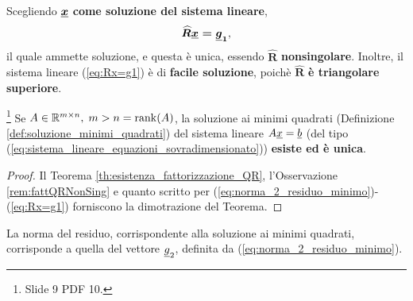 \addtocounter{footnote}{-6}







Scegliendo $\boldsymbol{\uline x}$ \textbf{come soluzione del sistema lineare},
\begin{equation}\label{eq:Rx=g1}
    \boldsymbol{\widehat R\uline x=\uline g_1},
\end{equation}
il quale ammette soluzione, e questa è unica, essendo $\boldsymbol{\widehat R}$ \textbf{\gls{nonsingolare}}. Inoltre, il sistema lineare (\ref{eq:Rx=g1}) è di \textbf{facile soluzione}, poichè $\boldsymbol{\widehat R}$ \textbf{è triangolare superiore}.

\begin{theorem}\footnote{Slide 9 PDF 10.}
    Se $A\in\mathbb R^{m\times n},\; m>n=\operatorname{rank}(A)$, la soluzione ai minimi quadrati (Definizione \ref{def:soluzione_minimi_quadrati}) del sistema lineare $A\uline x=\uline b$ (del tipo (\ref{eq:sistema_lineare_equazioni_sovradimensionato})) \textbf{esiste ed è unica}.
\end{theorem}
\begin{proof}
     Il Teorema \ref{th:esistenza_fattorizzazione_QR}, l'Osservazione \ref{rem:fattQRNonSing} e quanto scritto per (\ref{eq:norma_2_residuo_minimo})-(\ref{eq:Rx=g1}) forniscono la dimotrazione del Teorema.
\end{proof}

\begin{remark}
    La norma del residuo, corrispondente alla soluzione ai minimi quadrati, corrisponde a quella del vettore $\uline g_2$, definita da (\ref{eq:norma_2_residuo_minimo}).
\end{remark}

